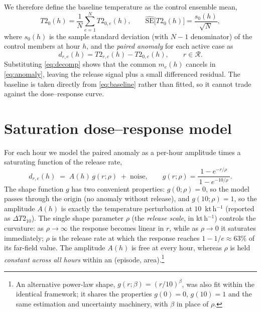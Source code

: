 \documentclass[11pt]{article}
\begin{document}
We therefore define the baseline temperature as the control ensemble mean,
\begin{equation}
  T2_0(h) = \frac{1}{N}\sum_{e=1}^{N} T2_{0,e}(h),
  \qquad
  \widehat{\mathrm{SE}}\big[T2_0(h)\big] = \frac{s_0(h)}{\sqrt{N}},
  \label{eq:baseline}
\end{equation}
where $s_0(h)$ is the sample standard deviation (with $N-1$ denominator) of the
control members at hour $h$, and the \emph{paired anomaly} for each active case as
\begin{equation}
  d_{r,e}(h) = T2_{r,e}(h) - T2_{0,e}(h),
  \qquad r\in\mathcal{R}.
  \label{eq:anomaly}
\end{equation}
Substituting \eqref{eq:decomp} shows that the common $m_e(h)$ cancels in
\eqref{eq:anomaly}, leaving the release signal plus a small differenced residual.
The baseline is taken directly from \eqref{eq:baseline} rather than fitted, so it
cannot trade against the dose--response curve.

\section{Saturation dose--response model}

For each hour we model the paired anomaly as a per-hour amplitude times a
saturating function of the release rate,
\begin{equation}
  d_{r,e}(h) \;=\; A(h)\, g(r;\rho) \;+\; \text{noise},
  \qquad
  g(r;\rho) = \frac{1 - e^{-r/\rho}}{\,1 - e^{-10/\rho}\,}.
  \label{eq:model}
\end{equation}
The shape function $g$ has two convenient properties: $g(0;\rho)=0$, so the model
passes through the origin (no anomaly without release), and $g(10;\rho)=1$, so the
amplitude $A(h)$ is exactly the temperature perturbation at $10$~kt\,h$^{-1}$
(reported as $\Delta T2_{10}$). The single shape parameter $\rho$ (the
\emph{release scale}, in kt\,h$^{-1}$) controls the curvature: as
$\rho\!\to\!\infty$ the response becomes linear in $r$, while as $\rho\!\to\!0$ it
saturates immediately; $\rho$ is the release rate at which the response reaches
$1-1/e\approx 63\%$ of its far-field value. The amplitude $A(h)$ is free at every
hour, whereas $\rho$ is held \emph{constant across all hours} within an
(episode, area).\footnote{An alternative power-law shape,
$g(r;\beta)=(r/10)^{\beta}$, was also fit within the identical framework; it shares
the properties $g(0)=0$, $g(10)=1$ and the same estimation and uncertainty
machinery, with $\beta$ in place of $\rho$.}
\end{document}
